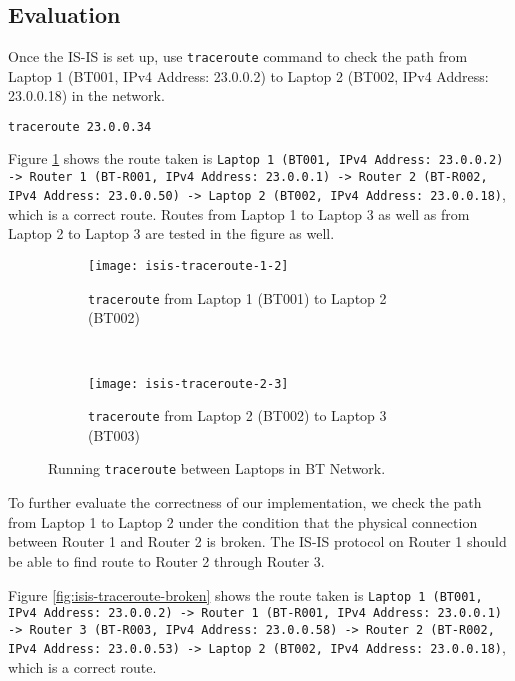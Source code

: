 \subsection{Evaluation}

Once the IS-IS is set up, use \texttt{traceroute} command to check the path from Laptop 1 (BT001, IPv4 Address: 23.0.0.2) to Laptop 2 (BT002, IPv4 Address: 23.0.0.18) in the network.

\begin{lstlisting}[language=sh]
traceroute 23.0.0.34
\end{lstlisting}

Figure \ref{fig:isis-traceroute} shows the route taken is 
\texttt{Laptop 1 (BT001, IPv4 Address: 23.0.0.2)
-> Router 1 (BT-R001, IPv4 Address: 23.0.0.1) 
-> Router 2 (BT-R002, IPv4 Address: 23.0.0.50)
-> Laptop 2 (BT002, IPv4 Address: 23.0.0.18)}, which is a correct route.
Routes from Laptop 1 to Laptop 3 as well as from Laptop 2 to Laptop 3 are tested in the figure as well.

\begin{figure}[ht!]
    \centering
    \begin{subfigure}[b]{\textwidth}
        \centering
        \texttt{[image: isis-traceroute-1-2]}
        \caption{\texttt{traceroute} from Laptop 1 (BT001) to Laptop 2 (BT002)}
    \end{subfigure}
    ~
    \begin{subfigure}[b]{\textwidth}
        \centering
        \texttt{[image: isis-traceroute-2-3]}
        \caption{\texttt{traceroute} from Laptop 2 (BT002) to Laptop 3 (BT003)}
    \end{subfigure}
    \caption{Running \texttt{traceroute} between Laptops in BT Network.}
    \label{fig:isis-traceroute}
\end{figure}

To further evaluate the correctness of our implementation, we check the path from Laptop 1 to Laptop 2 under the condition that the physical connection between Router 1 and Router 2 is broken. The IS-IS protocol on Router 1 should be able to find route to Router 2 through Router 3.

Figure \ref{fig:isis-traceroute-broken} shows the route taken is 
\texttt{Laptop 1 (BT001, IPv4 Address: 23.0.0.2)
-> Router 1 (BT-R001, IPv4 Address: 23.0.0.1) 
-> Router 3 (BT-R003, IPv4 Address: 23.0.0.58) 
-> Router 2 (BT-R002, IPv4 Address: 23.0.0.53)
-> Laptop 2 (BT002, IPv4 Address: 23.0.0.18)}, which is a correct route.


